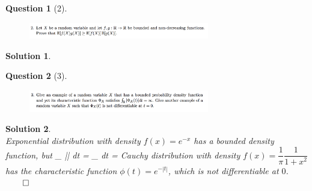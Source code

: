 \documentclass{article} %
\def\eQb#1\eQe{\begin{eqnarray*}#1\end{eqnarray*}}
\theoremstyle{quest}
\newtheorem*{question}{Question}
\newtheorem*{solution}{Solution}
\begin{document}
\newpage

\begin{question}[2]
\hfill
\begin{figure}[h!]
  \centering
    \includegraphics[width=0.7\textwidth]{prob-e3-p2.png}
\end{figure}
\end{question}
\begin{solution} \hfill \\
\end{solution}

\newpage

\begin{question}[3]
\hfill
\begin{figure}[h!]
  \centering
    \includegraphics[width=0.7\textwidth]{prob-e3-p3.png}
\end{figure}
\end{question}
\begin{solution} \hfill \\
Exponential distribution with density $f(x) = e^{-x}$ 
has a bounded density function, but 
\eQb
\int_{} || dt = \int_{} 
dt = \infty 
\eQe
Cauchy distribution with density $f(x) = \dfrac{1}{\pi} \dfrac{1}{1+x^2}$ 
has the characteristic function $\phi(t) = e^{-|t|}$, which is not differentiable 
at $0$. \hfill $\qed$
\end{solution}

\newpage
\end{document}
